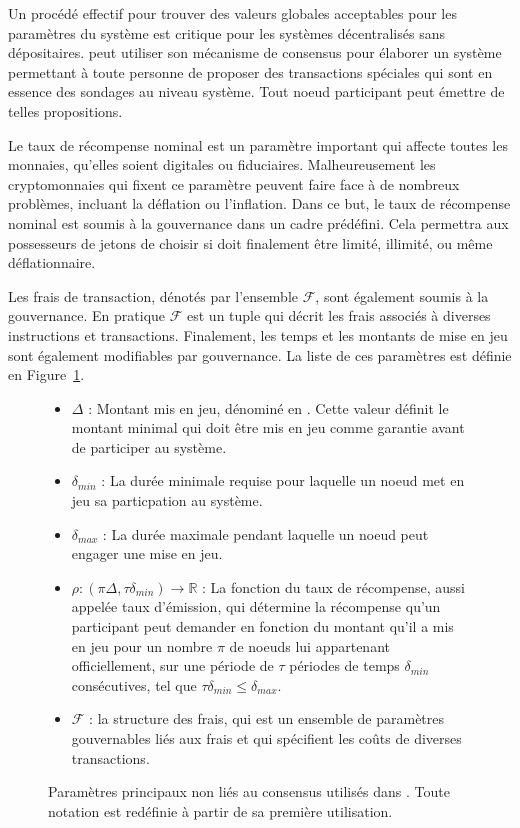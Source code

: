 \documentclass[runningheads]{llncs}
\begin{document}
Un procédé effectif pour trouver des valeurs globales acceptables pour les paramètres du système est critique pour les
systèmes décentralisés sans dépositaires. \AVAPlatformName{} peut utiliser son mécanisme de consensus pour élaborer un
système permettant à toute personne de proposer des transactions spéciales qui sont en essence des sondages au niveau
système. Tout noeud participant peut émettre de telles propositions.

Le taux de récompense nominal est un paramètre important qui affecte toutes les monnaies, qu'elles soient digitales ou
fiduciaires. Malheureusement les cryptomonnaies qui fixent ce paramètre peuvent faire face à de nombreux problèmes,
incluant la déflation ou l'inflation. Dans ce but, le taux de récompense nominal est soumis à la gouvernance dans un
cadre prédéfini. Cela permettra aux possesseurs de jetons de choisir si \AVATokenName{} doit finalement être limité,
illimité, ou même déflationnaire.

Les frais de transaction, dénotés par l'ensemble $\mathcal{F}$, sont également soumis à la gouvernance. En pratique
$\mathcal{F}$ est un tuple qui décrit les frais associés à diverses instructions et transactions. Finalement, les temps
et les montants de mise en jeu sont également modifiables par gouvernance. La liste de ces paramètres est définie en
Figure~\ref{fig:notation}.

\begin{figure}[hbtp]
\begin{framed}
\begin{itemize}
\item{$\Delta$} : Montant mis en jeu, dénominé en \AVATokenName. Cette valeur définit le montant minimal qui doit être
mis en jeu comme garantie avant de participer au système.
\item{$\delta_{min}$} : La durée minimale requise pour laquelle un noeud met en jeu sa particpation au système.
\item{$\delta_{max}$} : La durée maximale pendant laquelle un noeud peut engager une mise en jeu.
\item{$\rho: (\pi\Delta,\tau\delta_{min}) \rightarrow \mathbb{R}$} : La fonction du taux de récompense, aussi appelée
taux d'émission, qui détermine la récompense qu'un participant peut demander en fonction du montant qu'il a mis en jeu
pour un nombre $\pi$ de noeuds lui appartenant officiellement, sur une période de $\tau$ périodes de temps
$\delta_{min}$ consécutives, tel que $\tau\delta_{min} \leq \delta_{max}$.
\item{$\mathcal{F}$} : la structure des frais, qui est un ensemble de paramètres gouvernables liés aux frais et qui
spécifient les coûts de diverses transactions.
\end{itemize}
\end{framed}
\caption{Paramètres principaux non liés au consensus utilisés dans \AVAPlatformName{}. Toute notation est redéfinie à
partir de sa première utilisation.}
\label{fig:notation}
\end{figure}
\end{document}

